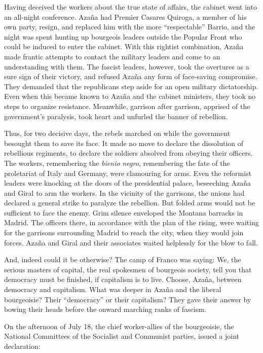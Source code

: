 Having deceived the workers about the true state of affairs, the cabinet went into an all-night conference. Azaña{\indexMAzana} had Premier Ca\-sa\-res Quiroga, a member of his own party, resign, and replaced him with the more ``respectable'' Barrio{\indexDBarrio}, and the night was spent hunting up bourgeois leaders outside the Popular Front who could be induced to enter the cabinet. With this rightist combination, Azaña made frantic attempts to contact the military leaders and come to an understanding with them. The fascist leaders, however, took the overtures as a sure sign of their victory, and refused Azaña any form of face-saving compromise. They demanded that the republicans step aside for an open military dictatorship. Even when this became known to Azaña and the cabinet ministers, they took no steps to organize resistance. Meanwhile, garrison after garrison, apprised of the government’s paralysis, took heart and unfurled the banner of rebellion.

Thus, for two decisive days, the rebels marched on while the government besought them to save its face. It made no move to declare the dissolution of rebellious regiments, to declare the soldiers absolved from obeying their officers. The workers, remembering the \emph{bienio negro}, remembering the fate of the proletariat of Italy and Germany, were clamouring for arms. Even the reformist leaders were knocking at the doors of the presidential palace, beseeching Azaña and Giral to arm the workers. In the vicinity of the garrisons, the unions had declared a general strike to paralyze the rebellion. But folded arms would not be sufficient to face the enemy. Grim silence enveloped the Montana barracks in Madrid. The officers there, in accordance with the plan of the rising, were waiting for the garrisons surrounding Madrid to reach the city, when they would join forces. Azaña and Giral and their associates waited helplessly for the blow to fall.

And, indeed could it be otherwise? The camp of Franco was saying: We, the serious masters of capital, the real spokesmen of bourgeois society, tell you that democracy must be finished, if capitalism is to live. Choose, Azaña, between democracy and capitalism. What was deeper in Azaña and the liberal bourgeoisie? Their ``democracy'' or their capitalism? They gave their answer by bowing their heads before the onward marching ranks of fascism.

On the afternoon of July 18, the chief worker-allies of the bourgeoisie, the National Committees of the Socialist and Communist parties, issued a joint declaration:


